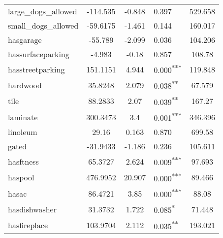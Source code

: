\documentclass[12pt]{report}
\begin{document}
\begin{longtable}{l S[table-format=6.4] S[table-format=3.4] l S[table-format=4.4]}
	large\_dogs\_allowed         & -114.535             & -0.848           & 0.397                      & 529.658                           \\
	small\_dogs\_allowed         & -59.6175             & -1.461           & 0.144                      & 160.017                           \\
	hasgarage                    & -55.789              & -2.099           & 0.036                      & 104.206                           \\
	hassurfaceparking            & -4.983               & -0.18            & 0.857                      & 108.78                            \\
	hasstreetparking             & 151.1151             & 4.944            & 0.000\textsuperscript{***} & 119.848                           \\
	hardwood                     & 35.8248              & 2.079            & 0.038\textsuperscript{**}  & 67.579                            \\
	tile                         & 88.2833              & 2.07             & 0.039\textsuperscript{**}  & 167.27                            \\
	laminate                     & 300.3473             & 3.4              & 0.001\textsuperscript{***} & 346.396                           \\
	linoleum                     & 29.16                & 0.163            & 0.870                      & 699.58                            \\
	gated                        & -31.9433             & -1.186           & 0.236                      & 105.611                           \\
	hasftness                    & 65.3727              & 2.624            & 0.009\textsuperscript{***} & 97.693                            \\
	haspool                      & 476.9952             & 20.907           & 0.000\textsuperscript{***} & 89.466                            \\
	hasac                        & 86.4721              & 3.85             & 0.000\textsuperscript{***} & 88.08                             \\
	hasdishwasher                & 31.3732              & 1.722            & 0.085\textsuperscript{*}   & 71.448                            \\
	hasfireplace                 & 103.9704             & 2.112            & 0.035\textsuperscript{**}  & 193.021                           \\

\end{longtable}
\end{document}
